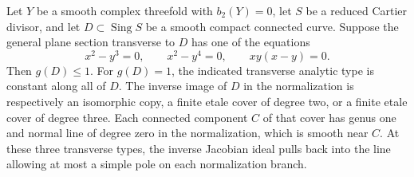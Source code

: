 
\begin{proposition}\label{cdp:st:C2d}
Let $Y$ be a smooth complex threefold with $b_2(Y)=0$, let $S$ be a reduced Cartier divisor, and let $D\subset\operatorname{Sing}S$ be a smooth compact connected curve. Suppose the general plane section transverse to $D$ has one of the equations
\[
 x^2-y^3=0,\qquad x^2-y^4=0,\qquad xy(x-y)=0.
 \tag{C.J.1}\label{cdp:eq:C.J.1}
\]
Then $g(D)\le1$. For $g(D)=1$, the indicated transverse analytic type is constant along all of $D$. The inverse image of $D$ in the normalization is respectively an isomorphic copy, a finite etale cover of degree two, or a finite etale cover of degree three. Each connected component $C$ of that cover has genus one and normal line of degree zero in the normalization, which is smooth near $C$. At these three transverse types, the inverse Jacobian ideal pulls back into the line allowing at most a simple pole on each normalization branch.
\end{proposition}
